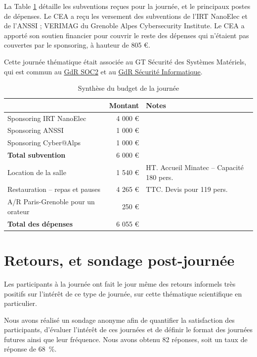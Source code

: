 \documentclass[a4paper,11pt]{article}
\begin{document}
La Table \ref{tab:org1ef45d4} détaille les subventions reçues pour la journée,
et le principaux postes de dépenses.
Le CEA a reçu les versement des subventions de l'IRT NanoElec et de
l'ANSSI ; VERIMAG du Grenoble Alpes Cybersecurity Institute.  Le CEA a apporté son
soutien financier pour couvrir le reste des dépenses qui n'étaient pas
couvertes par le sponsoring, à hauteur de 805 €.

Cette journée thématique était associée au GT Sécurité des Systèmes
Matériels, qui est commun au \href{http://www.gdr-soc.cnrs.fr}{GdR SOC2} et au \href{https://gdr-securite.irisa.fr}{GdR Sécurité Informatique}.

\begin{table}[htbp]
\caption{\label{tab:org1ef45d4}
Synthèse du budget de la journée}
\centering
\begin{tabular}{lrl}
\hline
 & Montant & Notes\\
\hline
Sponsoring IRT NanoElec & 4 000 € & \\
Sponsoring ANSSI & 1 000 € & \\
Sponsoring Cyber@Alps & 1 000 € & \\
\hline
\textbf{Total subvention} & 6 000 € & \\
\hline
\hline
Location de la salle & 1 540 € & HT. Accueil Minatec – Capacité 180 pers.\\
Restauration – repas et pauses & 4 265 € & TTC. Devis pour 119 pers.\\
A/R Paris-Grenoble pour un orateur & 250 € & \\
\hline
\textbf{Total des dépenses} & 6 055 € & \\
\hline
\end{tabular}
\end{table}

\section{Retours, et sondage post-journée}
\label{sec:org29e806f}

Les participants à la journée ont fait le jour même des retours
informels très positifs sur l'intérêt de ce type de journée, sur cette
thématique scientifique en particulier.

Nous avons réalisé un sondage anonyme afin de quantifier la satisfaction des participants, d'évaluer l'intérêt de ces journées et de définir le format des journées futures ainsi que leur fréquence.
Nous avons obtenu 82 réponses, soit un taux de réponse de 68 \%.
\end{document}
